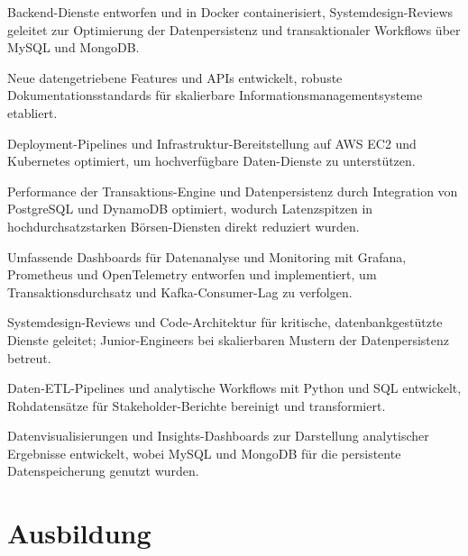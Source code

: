 \documentclass[10pt,a4paper]{resume}
\begin{document}
\bullets
  \item Backend-Dienste entworfen und in Docker containerisiert, Systemdesign-Reviews geleitet zur Optimierung der Datenpersistenz und transaktionaler Workflows über MySQL und MongoDB.
  \item Neue datengetriebene Features und APIs entwickelt, robuste Dokumentationsstandards für skalierbare Informationsmanagementsysteme etabliert.
  \item Deployment-Pipelines und Infrastruktur-Bereitstellung auf AWS EC2 und Kubernetes optimiert, um hochverfügbare Daten-Dienste zu unterstützen.
\bulletsend
\vspace{1.5pt}
\bullets
  \item Performance der Transaktions-Engine und Datenpersistenz durch Integration von PostgreSQL und DynamoDB optimiert, wodurch Latenzspitzen in hochdurchsatzstarken Börsen-Diensten direkt reduziert wurden.
  \item Umfassende Dashboards für Datenanalyse und Monitoring mit Grafana, Prometheus und OpenTelemetry entworfen und implementiert, um Transaktionsdurchsatz und Kafka-Consumer-Lag zu verfolgen.
  \item Systemdesign-Reviews und Code-Architektur für kritische, datenbankgestützte Dienste geleitet; Junior-Engineers bei skalierbaren Mustern der Datenpersistenz betreut.
\bulletsend
\vspace{1.5pt}
\bullets
  \item Daten-ETL-Pipelines und analytische Workflows mit Python und SQL entwickelt, Rohdatensätze für Stakeholder-Berichte bereinigt und transformiert.
  \item Datenvisualisierungen und Insights-Dashboards zur Darstellung analytischer Ergebnisse entwickelt, wobei MySQL und MongoDB für die persistente Datenspeicherung genutzt wurden.
\bulletsend
\vspace{1.5pt}

\section{Ausbildung}

\vspace{2pt}
\end{document}
